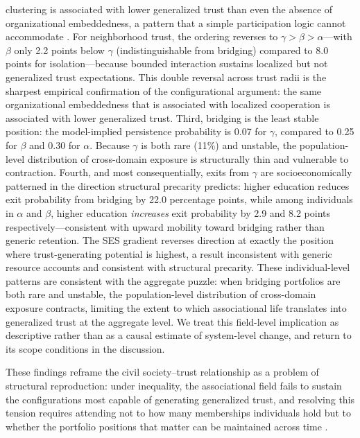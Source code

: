 clustering is associated with lower generalized trust than even the absence of organizational embeddedness, a pattern that a simple participation logic cannot accommodate \parencite{portes_social_1998,
stolle1998all}. For neighborhood trust, the ordering reverses to $\gamma > \beta > \alpha$---with $\beta$ only 2.2 points below $\gamma$ (indistinguishable from bridging) compared to 8.0 points for isolation---because bounded interaction sustains localized but not generalized trust expectations. This double reversal across trust radii is the sharpest empirical confirmation of the configurational argument: the same organizational embeddedness that is associated with localized cooperation is associated with lower generalized trust. Third, bridging is the least stable position: the model-implied persistence probability is 0.07 for $\gamma$, compared to 0.25 for $\beta$ and 0.30 for $\alpha$. Because $\gamma$ is both rare (11\%) and unstable, the population-level distribution of cross-domain exposure is structurally thin and vulnerable to contraction. Fourth, and most consequentially, exits from $\gamma$ are socioeconomically patterned in the direction structural precarity predicts: higher education reduces exit probability from bridging by 22.0 percentage points, while among individuals in $\alpha$ and $\beta$, higher education \textit{increases} exit probability by 2.9 and 8.2 points respectively---consistent with upward mobility toward bridging rather than generic retention. The SES gradient reverses direction at exactly the position where trust-generating potential is highest, a result inconsistent with generic resource accounts and consistent with structural precarity. These individual-level patterns are consistent with the aggregate puzzle: when bridging portfolios are both rare and unstable, the population-level distribution of cross-domain exposure contracts, limiting the extent to which associational life translates into generalized trust at the aggregate level. We treat this field-level implication as descriptive rather than as a causal estimate of system-level change, and return to its scope conditions in the discussion.

These findings reframe the civil society--trust relationship as a problem of structural reproduction: under inequality, the associational field fails to sustain the configurations most capable of generating generalized trust, and resolving this tension requires attending not to how many memberships individuals hold but to whether the portfolio positions that matter can be maintained across time \parencite{coleman_social_1988, putnam_bowling_2000,
paxton_association_2007}.

